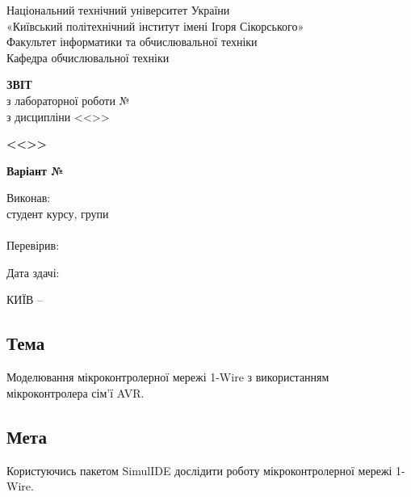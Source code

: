 \documentclass[14pt, a4paper]{extreport}
\begin{document}
	
	\begin{titlepage}
		\begin{center}
			\normalsize
			Національний технічний університет України\\
			«Київський політехнічний інститут імені Ігоря Сікорського» \\[0.5em]
			Факультет інформатики та обчислювальної техніки\\
			Кафедра обчислювальної техніки
			
			\vfill
			
			{\large \textbf{ЗВІТ}\\[0.5em]}
			{з лабораторної роботи №\LabNumber \\}
			{з дисципліни <<\CourseTitle>>}
			
			\vspace{2em}
			
			{\textbf{<<\Topic>>}}
			
			\vspace{1em}
			
			{\textbf{Варіант №\Variant}}
			
			\vfill
			
			\begin{flushright}
				Виконав: \\ студент \CourseNumber{} курсу, групи \StudentGroup \\
				\StudentName \\[1em]
				Перевірив: \\ \Teacher
			\end{flushright}
			
			\vfill
			
			\begin{flushright}
				Дата здачі: \DTMtoday
			\end{flushright}
			
			\vspace{5em}
			КИЇВ -- \ReportYear
		\end{center}
	\end{titlepage}
	
	\clearpage
	\setcounter{page}{2}
	
	\subsection*{Тема} 
	Моделювання мікроконтролерної мережі 1-Wire з використанням мікроконтролера сім'ї AVR.
	
	\subsection*{Мета} 
	Користуючись пакетом SimulIDE дослідити роботу мікроконтролерної мережі 1-Wire.
	
\end{document}
